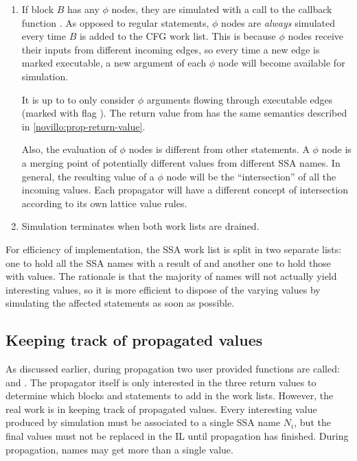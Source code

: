 \begin{enumerate}
\item	If block $B$ has any $\phi$ nodes, they are simulated
	with a call to the callback function
	.  As opposed to regular
	statements, $\phi$ nodes are \textit{always} simulated
	every time $B$ is added to the CFG work list.  This is
	because $\phi$ nodes receive their inputs from different
	incoming edges, so every time a new edge is marked
	executable, a new argument of each $\phi$ node will
	become available for simulation.

	It is up to  to only
	consider $\phi$ arguments flowing through executable
	edges (marked with flag ). The
	return value from  has the
	same semantics described in \ref{novillo:prop-return-value}.

	Also, the evaluation of $\phi$ nodes is different from
	other statements.  A $\phi$ node is a merging point
	of potentially different values from different SSA
	names.  In general, the resulting value of a $\phi$ node
	will be the ``intersection'' of all the incoming values.
	Each propagator will have a different concept of
	intersection according to its own lattice value rules.

\item	Simulation terminates when both work lists are drained.
\end{enumerate}

For efficiency of implementation, the SSA work list is split in
two separate lists: one to hold all the SSA names with a result
of  and another one to hold those with
 values.  The rationale is that
the majority of names will not actually yield interesting values,
so it is more efficient to dispose of the varying values by
simulating the affected statements as soon as possible.

\subsection{Keeping track of propagated values}

As discussed earlier, during propagation two user provided
functions are called:  and
.  The propagator itself is only
interested in the three return values to determine which blocks
and statements to add in the work lists.  However, the real work
is in keeping track of propagated values.  Every interesting
value produced by simulation must be associated to a single SSA
name $N_i$, but the final values must not be replaced in the IL
until propagation has finished.  During propagation, names may
get more than a single value.

